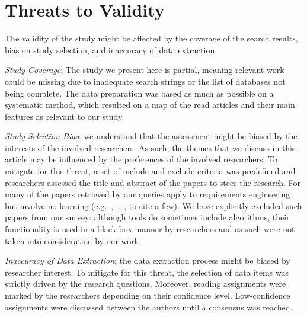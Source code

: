\section{Threats to Validity}
\label{sec:threats_to_validity}

The validity of the study might be affected by the coverage of the search
results, bias on study selection, and inaccuracy of data extraction.

\emph{Study Coverage}: The study we present here is partial, meaning
relevant work could be missing due to inadequate search strings or
the list of databases not being complete. The data preparation was based as
much as possible on a systematic method, which resulted on a map of the read
articles and their main features as relevant to our study.

\emph{Study Selection Bias}: we understand that the assessment might be biased
by the interests of the involved researchers. As such, the themes that we discuss
in this article may be influenced by the preferences of the involved
researchers. To mitigate for this threat, a set of include and exclude criteria
was predefined and researchers assessed the title and abstract of the papers to
steer the research. For many of the papers retrieved by our queries apply \NLP
to requirements engineering but involve no learning
(e.g.~\cite{Xiao:2012},~\cite{Deeptimahanti:2011},~\cite{ChengHeLiangLi:2010},
to cite a few). We have explicitly excluded such papers from our survey:
although \NLP tools do sometimes include \ML algorithms, their functionality is
used in a black-box manner by \RE researchers and as such were not taken into
consideration by our work.

\emph{Inaccuracy of Data Extraction}: the data extraction process might be
biased by researcher interest. To mitigate for this threat, the selection of
data items was strictly driven by the research questions. Moreover,
reading assignments were marked by the researchers depending on their confidence
level. Low-confidence assignments were discussed between the authors until a consensus was reached.